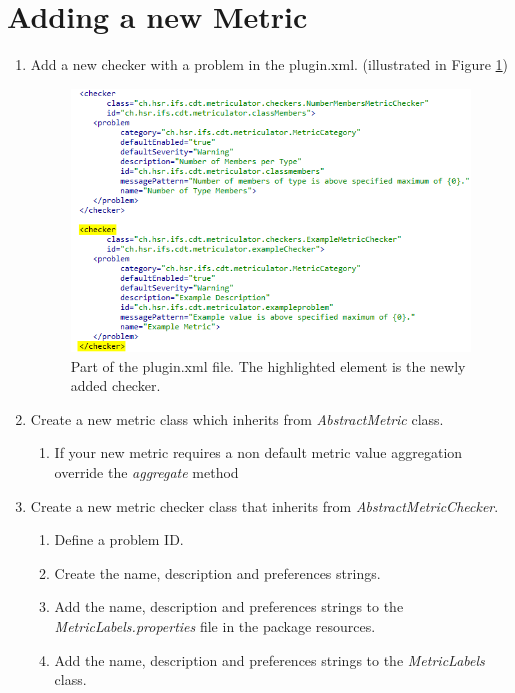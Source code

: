 \documentclass[11pt,a4paper,oneside]{scrreprt}
\begin{document}
\section{Adding a new Metric}
\begin{enumerate}
\item Add a new checker with a problem in the plugin.xml. (illustrated in Figure \ref{fig:pluginxml})
\begin{figure}[th]
\begin{center}
\includegraphics[scale=0.75]{figures/pluginxml.png}
\end{center}
\caption{Part of the plugin.xml file. The highlighted element is the newly added checker.}
\label{fig:pluginxml}
\end{figure}
\item Create a new metric class which inherits from \textit{AbstractMetric} class.
\begin{enumerate}
\item If your new metric requires a non default metric value aggregation override the \textit{aggregate} method
\end{enumerate}
\item Create a new metric checker class that inherits from \textit{AbstractMetricChecker}.
\begin{enumerate}
\item Define a problem ID.
\item Create the name, description and preferences strings.
\item Add the name, description and preferences strings to the \textit{MetricLabels.properties} file in the package resources.
\item Add the name, description and preferences strings to the \textit{MetricLabels} class.

\end{enumerate}
\end{enumerate}
\end{document}
